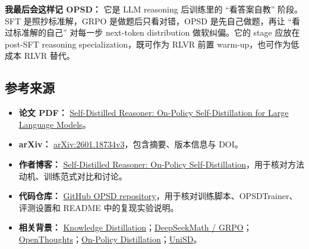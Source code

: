 \begin{summarybox}
\textbf{我最后会这样记 OPSD：} 它是 LLM reasoning 后训练里的 ``看答案自教'' 阶段。SFT 是照抄标准解，GRPO 是做题后只看对错，OPSD 是先自己做题，再让 ``看过标准解的自己'' 对每一步 next-token distribution 做软纠偏。它的 stage 应放在 post-SFT reasoning specialization，既可作为 RLVR 前置 warm-up，也可作为低成本 RLVR 替代。
\end{summarybox}

\subsection{参考来源}

\begin{itemize}[leftmargin=1.5em]
  \item \textbf{论文 PDF：} \href{https://siyan-zhao.github.io/assets/img/opsd/opsd_v3.pdf}{Self-Distilled Reasoner: On-Policy Self-Distillation for Large Language Models}。
  \item \textbf{arXiv：} \href{https://arxiv.org/abs/2601.18734}{arXiv:2601.18734v3}，包含摘要、版本信息与 DOI。
  \item \textbf{作者博客：} \href{https://siyan-zhao.github.io/blog/2026/opsd/}{Self-Distilled Reasoner: On-Policy Self-Distillation}，用于核对方法动机、训练范式对比和讨论。
  \item \textbf{代码仓库：} \href{https://github.com/siyan-zhao/OPSD}{GitHub OPSD repository}，用于核对训练脚本、OPSDTrainer、评测设置和 README 中的复现实验说明。
  \item \textbf{相关背景：} \href{https://arxiv.org/abs/1503.02531}{Knowledge Distillation}；\href{https://arxiv.org/abs/2402.03300}{DeepSeekMath / GRPO}；\href{https://arxiv.org/abs/2506.04178}{OpenThoughts}；\href{https://thinkingmachines.ai/blog/on-policy-distillation}{On-Policy Distillation}；\href{https://arxiv.org/abs/2605.06597}{UniSD}。
\end{itemize}

